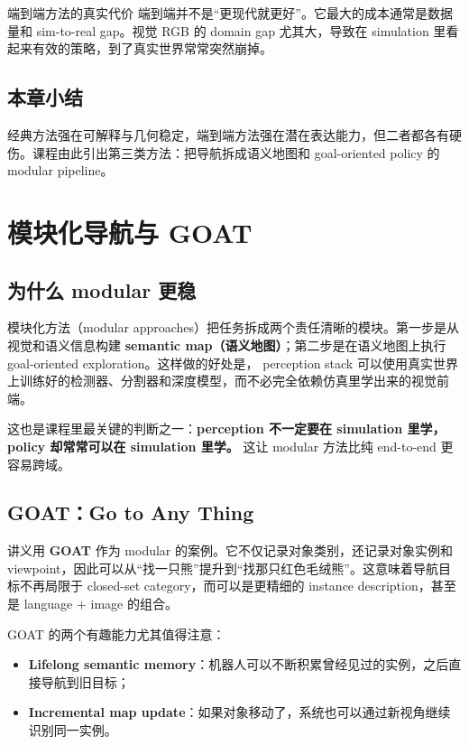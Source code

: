 \documentclass[a4paper]{article}
\begin{document}
\begin{importantbox}{端到端方法的真实代价}
端到端并不是“更现代就更好”。它最大的成本通常是数据量和 sim-to-real gap。视觉 RGB 的 domain gap 尤其大，导致在 simulation 里看起来有效的策略，到了真实世界常常突然崩掉。
\end{importantbox}

\subsection{本章小结}
经典方法强在可解释与几何稳定，端到端方法强在潜在表达能力，但二者都各有硬伤。课程由此引出第三类方法：把导航拆成语义地图和 goal-oriented policy 的 modular pipeline。

\section{模块化导航与 GOAT}
\subsection{为什么 modular 更稳}
模块化方法（modular approaches）把任务拆成两个责任清晰的模块。第一步是从视觉和语义信息构建 \textbf{semantic map（语义地图）}；第二步是在语义地图上执行 goal-oriented exploration。这样做的好处是， perception stack 可以使用真实世界上训练好的检测器、分割器和深度模型，而不必完全依赖仿真里学出来的视觉前端。

这也是课程里最关键的判断之一：\textbf{perception 不一定要在 simulation 里学，policy 却常常可以在 simulation 里学。} 这让 modular 方法比纯 end-to-end 更容易跨域。

\subsection{GOAT：Go to Any Thing}
讲义用 \textbf{GOAT} 作为 modular 的案例。它不仅记录对象类别，还记录对象实例和 viewpoint，因此可以从“找一只熊”提升到“找那只红色毛绒熊”。这意味着导航目标不再局限于 closed-set category，而可以是更精细的 instance description，甚至是 language + image 的组合。

GOAT 的两个有趣能力尤其值得注意：

\begin{itemize}
  \item \textbf{Lifelong semantic memory}：机器人可以不断积累曾经见过的实例，之后直接导航到旧目标；
  \item \textbf{Incremental map update}：如果对象移动了，系统也可以通过新视角继续识别同一实例。
\end{itemize}
\end{document}
